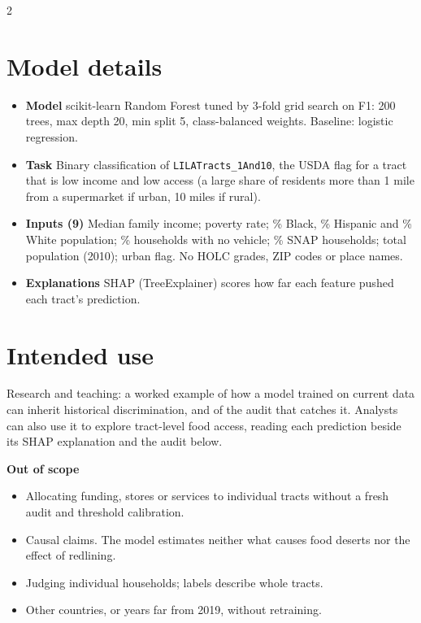 \documentclass[10pt,letterpaper]{article}
\newcommand{\lbl}[1]{\textbf{#1}\enspace}
\begin{document}
\vspace{2pt}
\raggedcolumns
\begin{multicols}{2}

\section*{Model details}
\begin{itemize}
  \item \lbl{Model} scikit-learn Random Forest tuned by 3-fold grid search on F1: 200 trees, max depth 20, min split 5, class-balanced weights. Baseline: logistic regression.
  \item \lbl{Task} Binary classification of \texttt{LILATracts\_1And10}, the USDA flag for a tract that is low income and low access (a large share of residents more than 1 mile from a supermarket if urban, 10 miles if rural).
  \item \lbl{Inputs (9)} Median family income; poverty rate; \% Black, \% Hispanic and \% White population; \% households with no vehicle; \% SNAP households; total population (2010); urban flag. No HOLC grades, ZIP codes or place names.
  \item \lbl{Explanations} SHAP (TreeExplainer) scores how far each feature pushed each tract's prediction.
\end{itemize}

\section*{Intended use}
Research and teaching: a worked example of how a model trained on current data can inherit historical discrimination, and of the audit that catches it. Analysts can also use it to explore tract-level food access, reading each prediction beside its SHAP explanation and the audit below.

\textbf{Out of scope}
\begin{itemize}
  \item Allocating funding, stores or services to individual tracts without a fresh audit and threshold calibration.
  \item Causal claims. The model estimates neither what causes food deserts nor the effect of redlining.
  \item Judging individual households; labels describe whole tracts.
  \item Other countries, or years far from 2019, without retraining.
\end{itemize}


\end{multicols}
\end{document}
